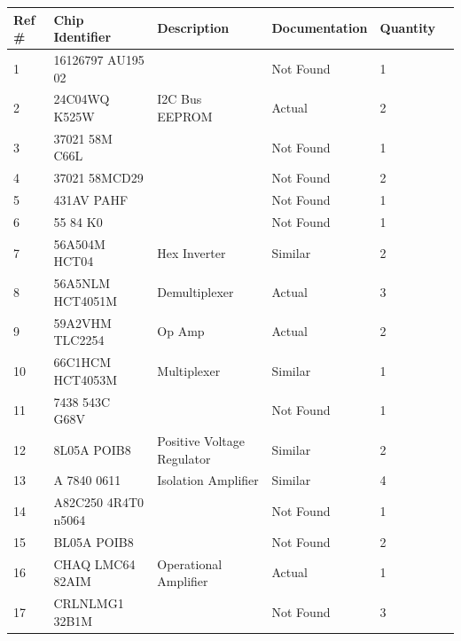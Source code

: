 \documentclass[]{formalLabReport}
\begin{document}
\begin{table}
    \begin{tabular}{|l|l|l|l|l|l|}
    \hline
    Ref \#& Chip Identifier     & Description                & Documentation & Quantity \\ \hline
    1     & 16126797 AU195 02   &                            & Not Found     & 1        \\ \hline
    2     & 24C04WQ K525W       & I2C Bus EEPROM             & Actual        & 2        \\ \hline
    3     & 37021 58M C66L      &                            & Not Found     & 1        \\ \hline
    4     & 37021 58MCD29       &                            & Not Found     & 2        \\ \hline
    5     & 431AV PAHF          &                            & Not Found     & 1        \\ \hline
    6     & 55 84 K0            &                            & Not Found     & 1        \\ \hline
    7     & 56A504M HCT04       & Hex Inverter               & Similar       & 2        \\ \hline
    8     & 56A5NLM HCT4051M    & Demultiplexer              & Actual        & 3        \\ \hline
    9     & 59A2VHM TLC2254     & Op Amp                     & Actual        & 2        \\ \hline
    10    & 66C1HCM HCT4053M    & Multiplexer                & Similar       & 1        \\ \hline
    11    & 7438 543C G68V      &                            & Not Found     & 1        \\ \hline
    12    & 8L05A POIB8         & Positive Voltage Regulator & Similar       & 2        \\ \hline
    13    & A 7840 0611         & Isolation Amplifier        & Similar       & 4        \\ \hline
    14    & A82C250 4R4T0 n5064 &                            & Not Found     & 1        \\ \hline
    15    & BL05A POIB8         &                            & Not Found     & 2        \\ \hline
    16    & CHAQ LMC64 82AIM    & Operational Amplifier      & Actual        & 1        \\ \hline
    17    & CRLNLMG1 32B1M      &                            & Not Found     & 3        \\ \hline

\end{tabular}
\end{table}
\end{document}
